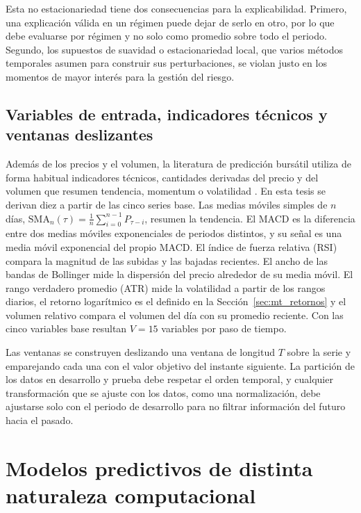 Esta no estacionariedad tiene dos consecuencias para la explicabilidad. Primero, una explicación válida en un régimen puede dejar de serlo en otro, por lo que debe evaluarse por régimen y no solo como promedio sobre todo el periodo. Segundo, los supuestos de suavidad o estacionariedad local, que varios métodos temporales asumen para construir sus perturbaciones, se violan justo en los momentos de mayor interés para la gestión del riesgo.

\subsection{Variables de entrada, indicadores técnicos y ventanas deslizantes}
\label{sec:mt_variables}

Además de los precios y el volumen, la literatura de predicción bursátil utiliza de forma habitual indicadores técnicos, cantidades derivadas del precio y del volumen que resumen tendencia, momentum o volatilidad \cite{kumbure2022}. En esta tesis se derivan diez a partir de las cinco series base. Las medias móviles simples de $n$ días, $\mathrm{SMA}_n(\tau)=\frac{1}{n}\sum_{i=0}^{n-1}P_{\tau-i}$, resumen la tendencia. El MACD es la diferencia entre dos medias móviles exponenciales de periodos distintos, y su señal es una media móvil exponencial del propio MACD. El índice de fuerza relativa (RSI) compara la magnitud de las subidas y las bajadas recientes. El ancho de las bandas de Bollinger mide la dispersión del precio alrededor de su media móvil. El rango verdadero promedio (ATR) mide la volatilidad a partir de los rangos diarios, el retorno logarítmico es el definido en la Sección~\ref{sec:mt_retornos} y el volumen relativo compara el volumen del día con su promedio reciente. Con las cinco variables base resultan $V=15$ variables por paso de tiempo.

Las ventanas se construyen deslizando una ventana de longitud $T$ sobre la serie y emparejando cada una con el valor objetivo del instante siguiente. La partición de los datos en desarrollo y prueba debe respetar el orden temporal, y cualquier transformación que se ajuste con los datos, como una normalización, debe ajustarse solo con el periodo de desarrollo para no filtrar información del futuro hacia el pasado.

\section{Modelos predictivos de distinta naturaleza computacional}
\label{sec:mt_modelos}

